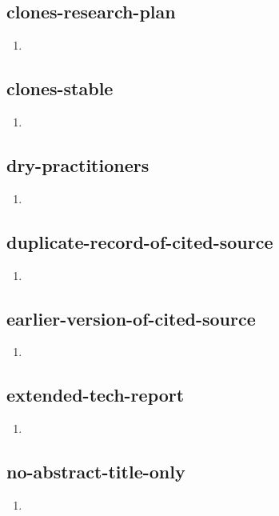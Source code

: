 \documentclass{article}
\begin{document}
\subsection{clones-research-plan}
\begin{enumerate}
\item {}
\end{enumerate}

\subsection{clones-stable}
\begin{enumerate}
\item {}
\end{enumerate}

\subsection{dry-practitioners}
\begin{enumerate}
\item {}
\end{enumerate}

\subsection{duplicate-record-of-cited-source}
\begin{enumerate}
\item {}
\end{enumerate}

\subsection{earlier-version-of-cited-source}
\begin{enumerate}
\item {}
\end{enumerate}

\subsection{extended-tech-report}
\begin{enumerate}
\item {}
\end{enumerate}

\subsection{no-abstract-title-only}
\begin{enumerate}
\item {}
\end{enumerate}
\end{document}
